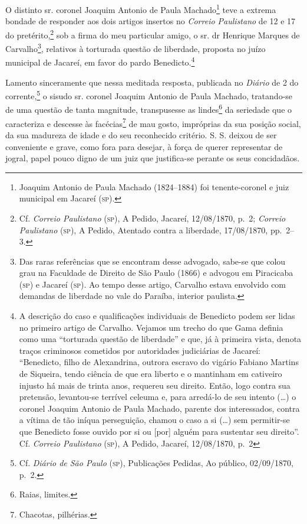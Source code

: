 {O distinto sr. coronel Joaquim Antonio de Paula Machado\footnote{
  Joaquim Antonio de Paula Machado (1824--1884) foi tenente-coronel e
  juiz municipal em Jacareí (\textsc{sp}).} teve a extrema bondade de responder
aos dois artigos insertos no \emph{Correio Paulistano} de 12 e 17 do
pretérito,\footnote{ Cf. \emph{Correio Paulistano} (\textsc{sp}), A Pedido,
  Jacareí, 12/08/1870, p.~2; \emph{Correio Paulistano} (\textsc{sp}), A Pedido,
  Atentado contra a liberdade, 17/08/1870, pp.~2--3.} sob a firma do meu
particular amigo, o sr. dr Henrique Marques de Carvalho\footnote{ Das
  raras referências que se encontram desse advogado, sabe-se que colou
  grau na Faculdade de Direito de São Paulo (1866) e advogou em
  Piracicaba (\textsc{sp}) e Jacareí (\textsc{sp}). Ao tempo desse artigo, Carvalho estava
  envolvido com demandas de liberdade no vale do Paraíba, interior
  paulista.}, relativos à torturada questão de liberdade, proposta no
juízo municipal de Jacareí, em favor do pardo Benedicto.\footnote{ A
  descrição do caso e qualificações individuais de Benedicto podem ser
  lidas no primeiro artigo de Carvalho. Vejamos um trecho do que Gama
  definia como uma ``torturada questão de liberdade'' e que, já à primeira
  vista, denota traços criminosos cometidos por autoridades judiciárias
  de Jacareí: ``Benedicto, filho de Alexandrina, outrora escravo do
  vigário Fabiano Martins de Siqueira, tendo ciência de que era liberto
  e o mantinham em cativeiro injusto há mais de trinta anos, requereu
  seu direito. Então, logo contra sua pretensão, levantou-se terrível
  celeuma e, para arredá-lo de seu intento (\ldots{}) o coronel Joaquim
  Antonio de Paula Machado, parente dos interessados, contra a vítima de
  tão iníqua perseguição, chamou o caso a si (\ldots{}) sem permitir-se que
  Benedicto fosse ouvido por si ou {[}por{]} alguém para sustentar seu
  direito''. Cf. \emph{Correio Paulistano} (\textsc{sp}), A Pedido, Jacareí,
  12/08/1870, p.~2}

Lamento sinceramente que nessa meditada resposta, publicada no
\emph{Diário} de 2 do corrente,\footnote{ Cf. \emph{Diário de São Paulo}
  (\textsc{sp}), Publicações Pedidas, Ao público, 02/09/1870, p.~2.} o sisudo sr.
coronel Joaquim Antonio de Paula Machado, tratando-se de uma questão de
tanta magnitude, transpusesse as lindes\footnote{ Raias, limites.} da
seriedade que o caracteriza e descesse às facécias\footnote{ Chacotas,
  pilhérias.} de mau gosto, impróprias da sua posição social, da sua
madureza de idade e do seu reconhecido critério. S. S. deixou de ser
conveniente e grave, como fora para desejar, à força de querer
representar de jogral, papel pouco digno de um juiz que justifica-se
perante os seus concidadãos.

}
